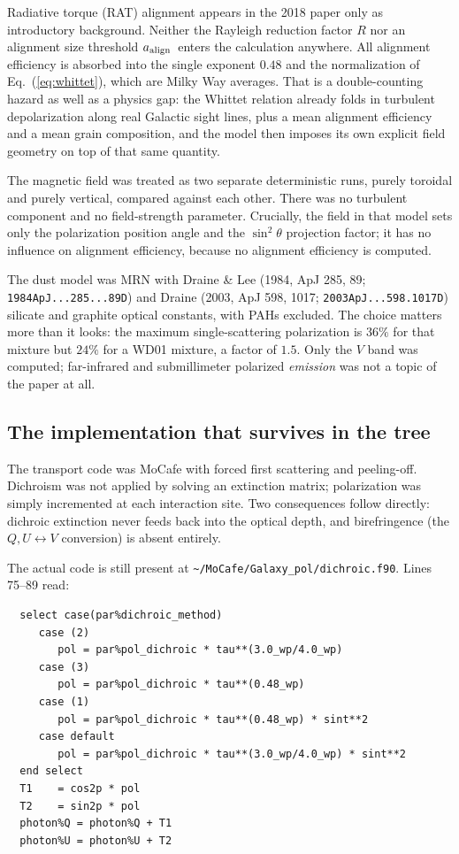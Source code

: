 \documentclass{my_memo}
\newcommand{\code}[1]{\texttt{#1}}
\newcommand{\aalign}{\ensuremath{a_{\rm align}}}
\begin{document}
Radiative torque (RAT) alignment appears in the 2018 paper only as
introductory background. Neither the Rayleigh reduction factor $R$ nor an
alignment size threshold \aalign\ enters the calculation anywhere. All
alignment efficiency is absorbed into the single exponent $0.48$ and the
normalization of Eq.~(\ref{eq:whittet}), which are Milky Way averages.
That is a double-counting hazard as well as a physics gap: the Whittet
relation already folds in turbulent depolarization along real Galactic
sight lines, plus a mean alignment efficiency and a mean grain
composition, and the model then imposes its own explicit field geometry
on top of that same quantity.

The magnetic field was treated as two separate deterministic runs, purely
toroidal and purely vertical, compared against each other. There was no
turbulent component and no field-strength parameter. Crucially, the field
in that model sets only the polarization position angle and the $\sin^2\theta$
projection factor; it has no influence on alignment efficiency, because
no alignment efficiency is computed.

The dust model was MRN with Draine \& Lee (1984, ApJ 285, 89;
\code{1984ApJ...285...89D}) and Draine (2003, ApJ 598, 1017;
\code{2003ApJ...598.1017D}) silicate and graphite optical constants, with
PAHs excluded. The choice matters more than it looks: the maximum
single-scattering polarization is $36\%$ for that mixture but $24\%$ for
a WD01 mixture, a factor of $1.5$. Only the $V$ band was computed;
far-infrared and submillimeter polarized \emph{emission} was not a topic
of the paper at all.

\subsection{The implementation that survives in the tree}

The transport code was MoCafe with forced first scattering and
peeling-off. Dichroism was not applied by solving an extinction matrix;
polarization was simply incremented at each interaction site. Two
consequences follow directly: dichroic extinction never feeds back into
the optical depth, and birefringence (the $Q,U \leftrightarrow V$
conversion) is absent entirely.

The actual code is still present at
\code{\textasciitilde/MoCafe/Galaxy\_pol/dichroic.f90}. Lines 75--89 read:

\begin{lstlisting}
  select case(par%dichroic_method)
     case (2)
        pol = par%pol_dichroic * tau**(3.0_wp/4.0_wp)
     case (3)
        pol = par%pol_dichroic * tau**(0.48_wp)
     case (1)
        pol = par%pol_dichroic * tau**(0.48_wp) * sint**2
     case default
        pol = par%pol_dichroic * tau**(3.0_wp/4.0_wp) * sint**2
  end select
  T1    = cos2p * pol
  T2    = sin2p * pol
  photon%Q = photon%Q + T1
  photon%U = photon%U + T2
\end{lstlisting}
\end{document}
